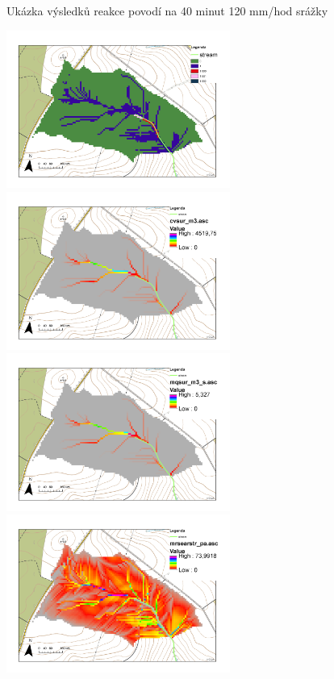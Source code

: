         \begin{frame}[plain]
            Ukázka výsledků reakce povodí na 40 minut 120 mm/hod srážky
            \begin{adjustwidth}{-3em}{-2em}
                    \includegraphics[width=0.55\textwidth]{obr/fstate.png}
                    \includegraphics[width=0.55\textwidth]{obr/cvsur.png}\\
                    \includegraphics[width=0.55\textwidth]{obr/mqsur.png}
                    \includegraphics[width=0.55\textwidth]{obr/mshear.png}
            \end{adjustwidth}
        \end{frame}


